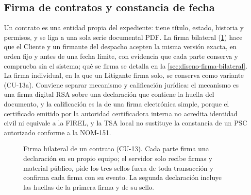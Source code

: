 \subsection{Firma de contratos y constancia de fecha}\label{sec:cu-firma}

Un contrato es una entidad propia del expediente: tiene título, estado,
historia y permisos, y se liga a una sola serie documental PDF. La firma
bilateral (\cref{fig:cu-13}) hace que el Cliente y un firmante del despacho
acepten la misma versión exacta, en orden fijo y antes de una fecha límite,
con evidencia que cada parte conserva y comprueba sin el sistema; qué se firma
se detalla en la \cref{sec:diseno-firma-bilateral}. La firma individual, en la
que un Litigante firma solo, se conserva como variante (CU-13a). Conviene
separar mecanismo y calificación jurídica: el mecanismo es una firma digital
RSA sobre una declaración que contiene la huella del documento, y la
calificación es la de una firma electrónica simple, porque el certificado
emitido por la autoridad certificadora interna no acredita identidad civil ni
equivale a la FIREL, y la TSA local no sustituye la constancia de un PSC
autorizado conforme a la NOM-151.

\begin{figure}[tbp]
  \centering
  
  \caption{Firma bilateral de un contrato (CU-13). Cada parte firma una
  declaración en su propio equipo; el servidor solo recibe firmas y material
  público, pide los tres sellos fuera de toda transacción y confirma cada
  firma con su evento. La segunda declaración incluye las huellas de la
  primera firma y de su sello.}
  \label{fig:cu-13}
\end{figure}

